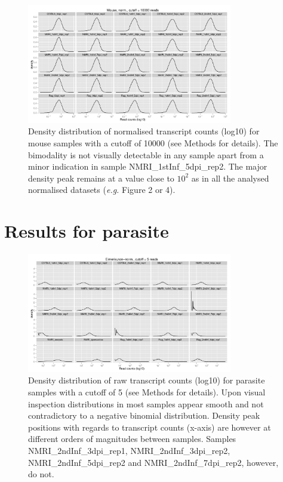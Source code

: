 \documentclass{article}
\begin{document}
\begin{figure}[h]
\begin{center}
\includegraphics[width=0.8\textwidth]{distributions_normmouse10000} %
\caption{Density distribution of normalised transcript counts (log10)
  for mouse samples with a cutoff of 10000 (see Methods for
  details). The bimodality is not visually detectable in any sample
  apart from a minor indication in sample
  NMRI\_1stInf\_5dpi\_rep2. The major density peak remains at a value
  close to $10^2$ as in all the analysed normalised datasets
  (\textit{e.g.} Figure 2 or 4).}
\end{center}
\end{figure}



\section{Results for parasite}

\begin{figure}[h]
\begin{center}
\includegraphics[width=0.8\textwidth]{distributions_Ef5} %
\caption{Density distribution of raw transcript counts (log10) for
  parasite samples with a cutoff of 5 (see Methods for details). Upon
  visual inspection distributions in most samples appear smooth and
  not contradictory to a negative binomial distribution. Density peak
  positions with regards to transcript counts (x-axis) are however at
  different orders of magnitudes between samples. Samples
  NMRI\_2ndInf\_3dpi\_rep1, NMRI\_2ndInf\_3dpi\_rep2,
  NMRI\_2ndInf\_5dpi\_rep2 and NMRI\_2ndInf\_7dpi\_rep2, however, do
  not.}
\end{center}
\end{figure}
\end{document}
